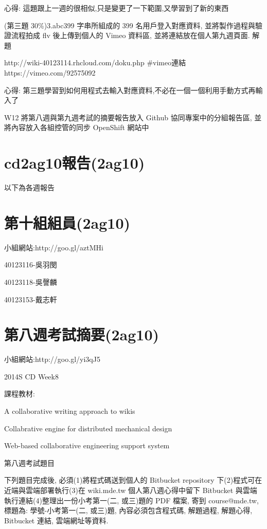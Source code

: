 \documentclass[]{article}
\begin{document}
心得: 這題跟上一週的很相似,只是變更了一下範圍,又學習到了新的東西

(第三題 30\%)3.abc399 字串所組成的 399 名用戶登入對應資料,
並將製作過程與驗證流程拍成 flv 後上傳到個人的 Vimeo 資料區,
並將連結放在個人第九週頁面. 解題

http://wiki-40123114.rhcloud.com/doku.php \#vimeo連結
https://vimeo.com/92575092

心得:
第三題學習到如何用程式去輸入對應資料,不必在一個一個利用手動方式再輸入了

W12 將第八週與第九週考試的摘要報告放入 Github 協同專案中的分組報告區,
並將內容放入各組控管的同步 OpenShift 網站中

\section{cd2ag10報告(2ag10)}\label{cd2ag10ux5831ux544a2ag10}

以下為各週報告

\section{第十組組員(2ag10)}\label{ux7b2cux5341ux7d44ux7d44ux54e12ag10}

小組網站:http://goo.gl/aztMHi

40123116-吳羽閔

40123118-吳謦麟

40123153-戴志軒

\section{第八週考試摘要(2ag10)}\label{ux7b2cux516bux9031ux8003ux8a66ux6458ux89812ag10}

小組網站:http://goo.gl/yi3qJ5

2014S CD Week8

課程教材:

A collaborative writing approach to wikis

Collabrative engine for distributed mechanical design

Web-based collaborative engineering support system

第八週考試題目

下列題目完成後, 必須(1)將程式碼送到個人的 Bitbucket repository
下(2)程式可在近端與雲端部署執行(3)在 wiki.mde.tw 個人第八週心得中留下
Bitbucket 與雲端執行連結(4)整理出一份小考第一(二, 或三)題的 PDF 檔案,
寄到 course@mde.tw, 標題為: 學號-小考第一(二, 或三)題,
內容必須包含程式碼, 解題過程, 解題心得, Bitbucket 連結, 雲端網址等資料.
\end{document}
